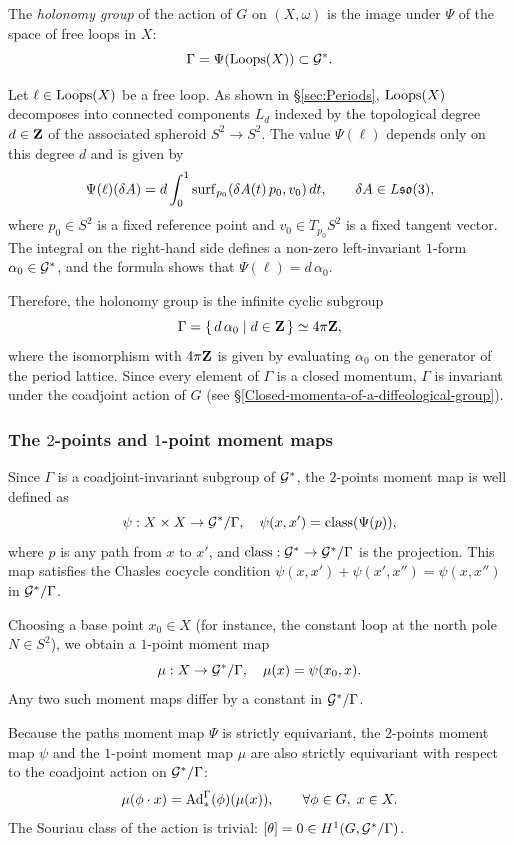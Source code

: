\documentclass[11pt,reqno,letterpaper,twoside]{amsart}
\begin{document}
The \emph{holonomy group} of the action of $G$ on $(X,\omega)$ is the image
under $\Psi$ of the space of free loops in $X$:
\[
\Gamma = \Psi(\operatorname{Loops}(X)) \subset \mathcal{G}^{*}.
\]

Let $\ell \in \operatorname{Loops}(X)$ be a free loop.  As shown in \S\ref{sec:Periods},
$\operatorname{Loops}(X)$ decomposes into connected components $L_{d}$ indexed by the
topological degree $d \in {\mathbf{Z}}$ of the associated spheroid $S^{2} \to S^{2}$.
The value $\Psi(\ell)$ depends only on this degree $d$ and is given by
\[
\Psi(\ell)(\delta A) = d \int_{0}^{1} \operatorname{surf}_{p_{0}}(\delta A(t)\,p_{0}, v_{0})\, dt,
\qquad \delta A \in L\mathfrak{so}(3),
\]
where $p_{0} \in S^{2}$ is a fixed reference point and $v_{0} \in T_{p_{0}}S^{2}$ is
a fixed tangent vector.  The integral on the right-hand side defines a non-zero
left-invariant $1$-form $\alpha_{0} \in \mathcal{G}^{*}$, and the formula shows that
$\Psi(\ell) = d\,\alpha_{0}$.

Therefore, the holonomy group is the infinite cyclic subgroup
\[
\Gamma = \{\, d\,\alpha_{0} \mid d \in {\mathbf{Z}} \,\} \simeq 4\pi{\mathbf{Z}},
\]
where the isomorphism with $4\pi{\mathbf{Z}}$ is given by evaluating $\alpha_{0}$
on the generator of the period lattice.
Since every element of $\Gamma$ is a closed momentum,
$\Gamma$ is invariant under the coadjoint action of $G$
(see \S\ref{Closed-momenta-of-a-diffeological-group}).

\subsubsection{The $2$-points and $1$-point moment maps}

Since $\Gamma$ is a coadjoint-invariant subgroup of $\mathcal{G}^{*}$,
the $2$-points moment map is well defined as
\[
\psi : X \times X \to \mathcal{G}^{*}/\Gamma,
\quad
\psi(x,x') = \operatorname{class}(\Psi(p)),
\]
where $p$ is any path from $x$ to $x'$, and $\operatorname{class} : \mathcal{G}^{*} \to \mathcal{G}^{*}/\Gamma$
is the projection.
This map satisfies the Chasles cocycle condition
$\psi(x,x') + \psi(x',x'') = \psi(x,x'')$ in $\mathcal{G}^{*}/\Gamma$.

Choosing a base point $x_{0} \in X$ (for instance, the constant loop at the north pole
$N \in S^{2}$), we obtain a $1$-point moment map
\[
\mu : X \to \mathcal{G}^{*}/\Gamma,
\quad
\mu(x) = \psi(x_{0}, x).
\]
Any two such moment maps differ by a constant in $\mathcal{G}^{*}/\Gamma$.

Because the paths moment map $\Psi$ is strictly equivariant,
the $2$-points moment map $\psi$ and the $1$-point moment map $\mu$
are also strictly equivariant with respect to the coadjoint action on $\mathcal{G}^{*}/\Gamma$:
\[
\mu(\phi \cdot x) = \mathrm{Ad}_{*}^{\Gamma}(\phi)(\mu(x)), \qquad \forall \phi \in G,\; x \in X.
\]
The Souriau class of the action is trivial: $[\theta] = 0 \in H^{1}(G, \mathcal{G}^{*}/\Gamma)$.
\end{document}
